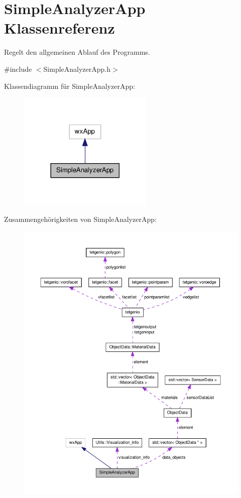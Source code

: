 \hypertarget{classSimpleAnalyzerApp}{\section{Simple\-Analyzer\-App Klassenreferenz}
\label{classSimpleAnalyzerApp}
}


Regelt den allgemeinen Ablauf des Programms.  




{\ttfamily \#include $<$Simple\-Analyzer\-App.\-h$>$}



Klassendiagramm für Simple\-Analyzer\-App\-:\nopagebreak
\begin{figure}[H]
\begin{center}
\leavevmode
\includegraphics[width=182pt]{classSimpleAnalyzerApp__inherit__graph}
\end{center}
\end{figure}


Zusammengehörigkeiten von Simple\-Analyzer\-App\-:
\nopagebreak
\begin{figure}[H]
\begin{center}
\leavevmode
\includegraphics[width=350pt]{classSimpleAnalyzerApp__coll__graph}
\end{center}
\end{figure}
